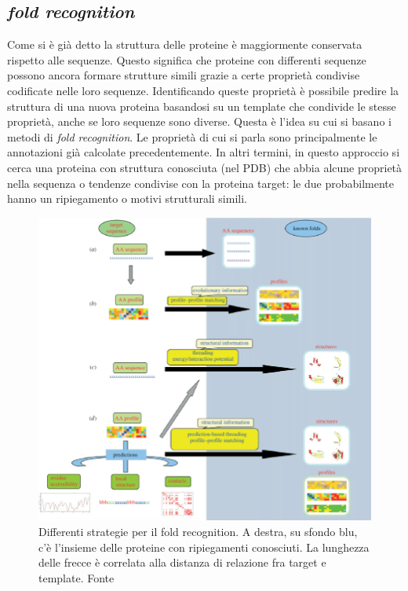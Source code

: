 \subsection{\textit{fold recognition}}
{

Come si è già detto la struttura delle proteine è maggiormente conservata rispetto alle sequenze. Questo significa che proteine con differenti sequenze possono ancora formare strutture simili grazie a certe proprietà condivise codificate nelle loro sequenze. Identificando queste proprietà è possibile predire la struttura di una nuova proteina basandosi su un template che condivide le stesse proprietà, anche se loro sequenze sono diverse. Questa è l'idea su cui si basano i metodi di \textit{fold recognition}. Le proprietà di cui si parla sono principalmente le annotazioni già calcolate precedentemente.
In altri termini, in questo approccio si cerca una proteina con struttura conosciuta (nel PDB) che abbia alcune proprietà nella sequenza o tendenze condivise con la proteina target: le due probabilmente hanno un ripiegamento o motivi strutturali simili.

\begin{figure}[!htb]
	\centering
	\includegraphics[scale=0.53]{images/threading-mappa.png}
	\caption{Differenti strategie per il fold recognition. A destra, su sfondo blu, c'è l'insieme delle proteine con ripiegamenti conosciuti. La lunghezza delle frecce è correlata alla distanza di relazione fra target e template. Fonte\cite{joseph2014local}}
	\label{fig:fold-recognition}
\end{figure}

}
